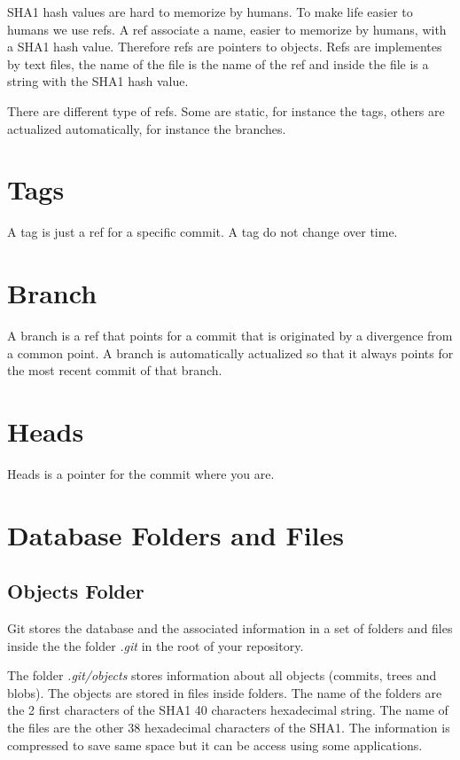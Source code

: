 SHA1 hash values are hard to memorize by humans. To make life easier to humans we use refs. A ref associate a name, easier to memorize by humans, with a SHA1 hash value. Therefore refs are pointers to objects. Refs are implementes by text files, the name of the file is the name of the ref and inside the file is a string with the SHA1 hash value.

There are different type of refs. Some are static, for instance the tags, others are actualized automatically, for instance the branches.

\section{Tags}

A tag is just a ref for a specific commit. A tag do not change over time.

\section{Branch}

A branch is a ref that points for a commit that is originated by a divergence from a common point.
A branch is automatically actualized so that it always points for the most recent commit of that branch.

\section{Heads}

Heads is a pointer for the commit where you are.

\section{Database Folders and Files}

\subsection{Objects Folder}

Git stores the database and the associated information in a set of folders and files inside the the folder \emph{.git} in the root of your repository.

The folder \emph{.git/objects} stores information about all objects (commits, trees and blobs).
The objects are stored in files inside folders.
The name of the folders are the 2 first characters of the SHA1 40 characters hexadecimal string.
The name of the files are the other 38 hexadecimal characters of the SHA1.
The information is compressed to save same space but it can be access using some applications.

